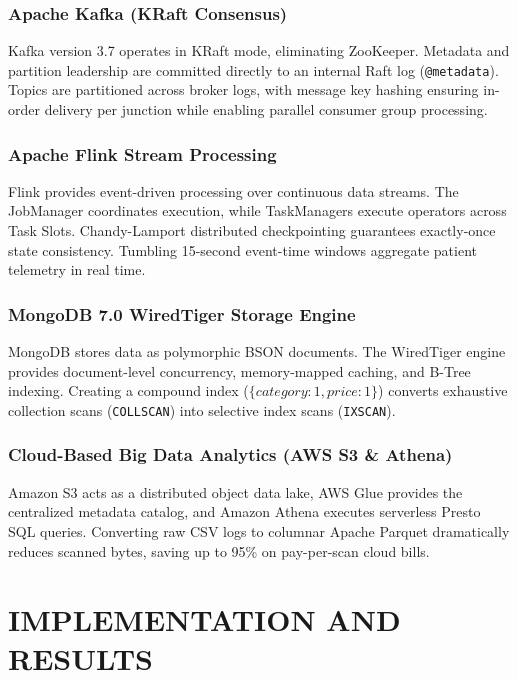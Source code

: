 \documentclass[12pt,a4paper]{report}
\begin{document}
\subsection{Apache Kafka (KRaft Consensus)}
Kafka version 3.7 operates in KRaft mode, eliminating ZooKeeper. Metadata and partition leadership are committed directly to an internal Raft log (\texttt{@metadata}). Topics are partitioned across broker logs, with message key hashing ensuring in-order delivery per junction while enabling parallel consumer group processing.

\subsection{Apache Flink Stream Processing}
Flink provides event-driven processing over continuous data streams. The JobManager coordinates execution, while TaskManagers execute operators across Task Slots. Chandy-Lamport distributed checkpointing guarantees exactly-once state consistency. Tumbling 15-second event-time windows aggregate patient telemetry in real time.

\subsection{MongoDB 7.0 WiredTiger Storage Engine}
MongoDB stores data as polymorphic BSON documents. The WiredTiger engine provides document-level concurrency, memory-mapped caching, and B-Tree indexing. Creating a compound index ($\{category: 1, price: 1\}$) converts exhaustive collection scans (\texttt{COLLSCAN}) into selective index scans (\texttt{IXSCAN}).

\subsection{Cloud-Based Big Data Analytics (AWS S3 \& Athena)}
Amazon S3 acts as a distributed object data lake, AWS Glue provides the centralized metadata catalog, and Amazon Athena executes serverless Presto SQL queries. Converting raw CSV logs to columnar Apache Parquet dramatically reduces scanned bytes, saving up to 95\% on pay-per-scan cloud bills.

\clearpage

\chapter{IMPLEMENTATION AND RESULTS}
\end{document}
